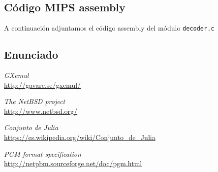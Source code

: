 \documentclass[10pt,a4paper]{article}
\begin{document}
\subsection{Código MIPS assembly}
A continuación adjuntamos el código assembly del módulo \texttt{decoder.c}


\subsection{Enunciado}


\begin{thebibliography}{99}
 \emph{GXemul}\\
\url{http://gavare.se/gxemul/}

 \emph{The NetBSD project}\\
\url{http://www.netbsd.org/}

 \emph{Conjunto de Julia}\\
\url{https://es.wikipedia.org/wiki/Conjunto_de_Julia}

 \emph{PGM format specification}\\
\url{http://netpbm.sourceforge.net/doc/pgm.html}

\end{thebibliography}
\end{document}
